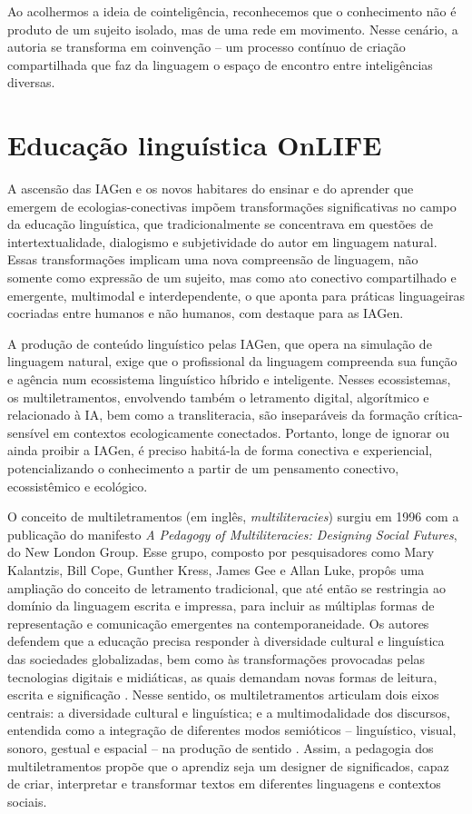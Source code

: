 \documentclass[portuguese]{textolivre}
\begin{document}
Ao acolhermos a ideia de cointeligência, reconhecemos que o conhecimento não é produto de um sujeito isolado, mas de uma rede em movimento. Nesse cenário, a autoria se transforma em coinvenção – um processo contínuo de criação compartilhada que faz da linguagem o espaço de encontro entre inteligências diversas.

\section{Educação linguística OnLIFE}\label{sec-7}
A ascensão das IAGen e os novos habitares do ensinar e do aprender que emergem de ecologias-conectivas impõem transformações significativas no campo da educação linguística, que tradicionalmente se concentrava em questões de intertextualidade, dialogismo e subjetividade do autor em linguagem natural. Essas transformações implicam uma nova compreensão de linguagem, não somente como expressão de um sujeito, mas como ato conectivo compartilhado e emergente, multimodal e interdependente, o que aponta para práticas linguageiras cocriadas entre humanos e não humanos, com destaque para as IAGen.

A produção de conteúdo linguístico pelas IAGen, que opera na simulação de linguagem natural, exige que o profissional da linguagem compreenda sua função e agência num ecossistema linguístico híbrido e inteligente. Nesses ecossistemas, os multiletramentos, envolvendo também o letramento digital, algorítmico e relacionado à IA, bem como a transliteracia, são inseparáveis da formação crítica-sensível em contextos ecologicamente conectados. Portanto, longe de ignorar ou ainda proibir a IAGen, é preciso habitá-la de forma conectiva e experiencial, potencializando o conhecimento a partir de um pensamento conectivo, ecossistêmico e ecológico.

O conceito de multiletramentos (em inglês, \textit{multiliteracies}) surgiu em 1996 com a publicação do manifesto \textit{A Pedagogy of Multiliteracies: Designing Social Futures}, do New London Group. Esse grupo, composto por pesquisadores como Mary Kalantzis, Bill Cope, Gunther Kress, James Gee e Allan Luke, propôs uma ampliação do conceito de letramento tradicional, que até então se restringia ao domínio da linguagem escrita e impressa, para incluir as múltiplas formas de representação e comunicação emergentes na contemporaneidade. Os autores defendem que a educação precisa responder à diversidade cultural e linguística das sociedades globalizadas, bem como às transformações provocadas pelas tecnologias digitais e midiáticas, as quais demandam novas formas de leitura, escrita e significação \cite{newlondongroup1996pedagogy}. Nesse sentido, os multiletramentos articulam dois eixos centrais: a diversidade cultural e linguística; e a multimodalidade dos discursos, entendida como a integração de diferentes modos semióticos – linguístico, visual, sonoro, gestual e espacial – na produção de sentido \cite{cope2000multiliteracies,cope2009multiliteracies}. Assim, a pedagogia dos multiletramentos propõe que o aprendiz seja um designer de significados, capaz de criar, interpretar e transformar textos em diferentes linguagens e contextos sociais.
\end{document}
